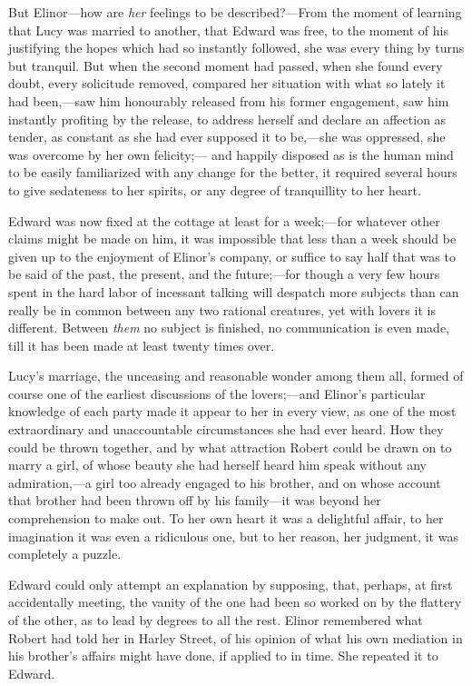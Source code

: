 \documentclass{article}
\begin{document}
But Elinor---how are \emph{her} feelings to be described?---From
the moment of learning that Lucy was married to another,
that Edward was free, to the moment of his justifying
the hopes which had so instantly followed, she was every
thing by turns but tranquil.  But when the second moment
had passed, when she found every doubt, every solicitude
removed, compared her situation with what so lately it
had been,---saw him honourably released from his former
engagement, saw him instantly profiting by the release,
to address herself and declare an affection as tender,
as constant as she had ever supposed it to be,---she
was oppressed, she was overcome by her own felicity;---%
and happily disposed as is the human mind to be easily
familiarized with any change for the better, it required
several hours to give sedateness to her spirits, or any
degree of tranquillity to her heart.

Edward was now fixed at the cottage at least for
a week;---for whatever other claims might be made on him,
it was impossible that less than a week should be given
up to the enjoyment of Elinor's company, or suffice
to say half that was to be said of the past, the present,
and the future;---for though a very few hours spent in
the hard labor of incessant talking will despatch more
subjects than can really be in common between any two
rational creatures, yet with lovers it is different.
Between \emph{them} no subject is finished, no communication
is even made, till it has been made at least twenty
times over.

Lucy's marriage, the unceasing and reasonable wonder
among them all, formed of course one of the earliest
discussions of the lovers;---and Elinor's particular knowledge
of each party made it appear to her in every view, as one
of the most extraordinary and unaccountable circumstances
she had ever heard.  How they could be thrown together,
and by what attraction Robert could be drawn on to marry
a girl, of whose beauty she had herself heard him speak
without any admiration,---a girl too already engaged
to his brother, and on whose account that brother had been
thrown off by his family---it was beyond her comprehension
to make out.  To her own heart it was a delightful affair,
to her imagination it was even a ridiculous one, but
to her reason, her judgment, it was completely a puzzle.

Edward could only attempt an explanation by supposing,
that, perhaps, at first accidentally meeting, the vanity
of the one had been so worked on by the flattery
of the other, as to lead by degrees to all the rest.
Elinor remembered what Robert had told her in Harley Street,
of his opinion of what his own mediation in his brother's
affairs might have done, if applied to in time.
She repeated it to Edward.
\end{document}
